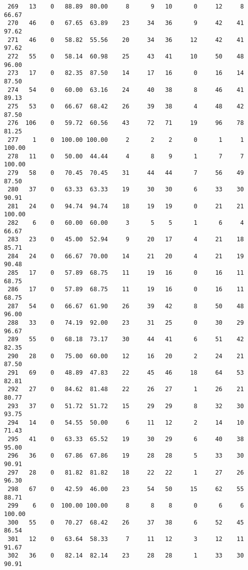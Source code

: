 \begin{verbatim}
 269   13    0   88.89  80.00     8      9   10      0     12     8    66.67
 270   46    0   67.65  63.89    23     34   36      9     42    41    97.62
 271   46    0   58.82  55.56    20     34   36     12     42    41    97.62
 272   55    0   58.14  60.98    25     43   41     10     50    48    96.00
 273   17    0   82.35  87.50    14     17   16      0     16    14    87.50
 274   54    0   60.00  63.16    24     40   38      8     46    41    89.13
 275   53    0   66.67  68.42    26     39   38      4     48    42    87.50
 276  106    0   59.72  60.56    43     72   71     19     96    78    81.25
 277    1    0  100.00 100.00     2      2    2      0      1     1   100.00
 278   11    0   50.00  44.44     4      8    9      1      7     7   100.00
 279   58    0   70.45  70.45    31     44   44      7     56    49    87.50
 280   37    0   63.33  63.33    19     30   30      6     33    30    90.91
 281   24    0   94.74  94.74    18     19   19      0     21    21   100.00
 282    6    0   60.00  60.00     3      5    5      1      6     4    66.67
 283   23    0   45.00  52.94     9     20   17      4     21    18    85.71
 284   24    0   66.67  70.00    14     21   20      4     21    19    90.48
 285   17    0   57.89  68.75    11     19   16      0     16    11    68.75
 286   17    0   57.89  68.75    11     19   16      0     16    11    68.75
 287   54    0   66.67  61.90    26     39   42      8     50    48    96.00
 288   33    0   74.19  92.00    23     31   25      0     30    29    96.67
 289   55    0   68.18  73.17    30     44   41      6     51    42    82.35
 290   28    0   75.00  60.00    12     16   20      2     24    21    87.50
 291   69    0   48.89  47.83    22     45   46     18     64    53    82.81
 292   27    0   84.62  81.48    22     26   27      1     26    21    80.77
 293   37    0   51.72  51.72    15     29   29      8     32    30    93.75
 294   14    0   54.55  50.00     6     11   12      2     14    10    71.43
 295   41    0   63.33  65.52    19     30   29      6     40    38    95.00
 296   36    0   67.86  67.86    19     28   28      5     33    30    90.91
 297   28    0   81.82  81.82    18     22   22      1     27    26    96.30
 298   67    0   42.59  46.00    23     54   50     15     62    55    88.71
 299    6    0  100.00 100.00     8      8    8      0      6     6   100.00
 300   55    0   70.27  68.42    26     37   38      6     52    45    86.54
 301   12    0   63.64  58.33     7     11   12      3     12    11    91.67
 302   36    0   82.14  82.14    23     28   28      1     33    30    90.91

\end{verbatim}
